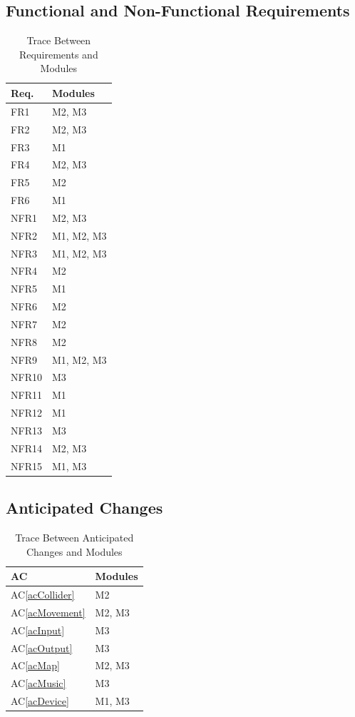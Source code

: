 \documentclass[12pt, titlepage]{article}
\newcommand{\acref}[1]{AC\ref{#1}}
\begin{document}
\subsection{Functional and Non-Functional Requirements}
\begin{table}[H]
\centering
\begin{tabular}{p{} p{}}
\toprule
\textbf{Req.} & \textbf{Modules}\\
\midrule
FR1 & M2, M3\\
FR2 & M2, M3\\
FR3 & M1\\
FR4 & M2, M3\\
FR5 & M2\\
FR6 & M1\\
\midrule
NFR1 & M2, M3\\
NFR2 & M1, M2, M3\\
NFR3 & M1, M2, M3\\
NFR4 & M2\\
NFR5 & M1\\
NFR6 & M2\\
NFR7 & M2\\
NFR8 & M2\\
NFR9 & M1, M2, M3\\
NFR10 & M3\\
NFR11 & M1\\
NFR12 & M1\\
NFR13 & M3\\
NFR14 & M2, M3\\
NFR15 & M1, M3\\
\bottomrule
\end{tabular}
\caption{Trace Between Requirements and Modules}
\label{TblRT}
\end{table}

\subsection{Anticipated Changes}
\begin{table}[H]
\centering
\begin{tabular}{p{} p{}}
\toprule
\textbf{AC} & \textbf{Modules}\\
\midrule
\acref{acCollider} & M2\\
\acref{acMovement} & M2, M3\\
\acref{acInput} & M3\\
\acref{acOutput} & M3\\
\acref{acMap} & M2, M3\\
\acref{acMusic} & M3\\
\acref{acDevice} & M1, M3\\
\bottomrule
\end{tabular}
\caption{Trace Between Anticipated Changes and Modules}
\label{TblACT}
\end{table}
\end{document}
